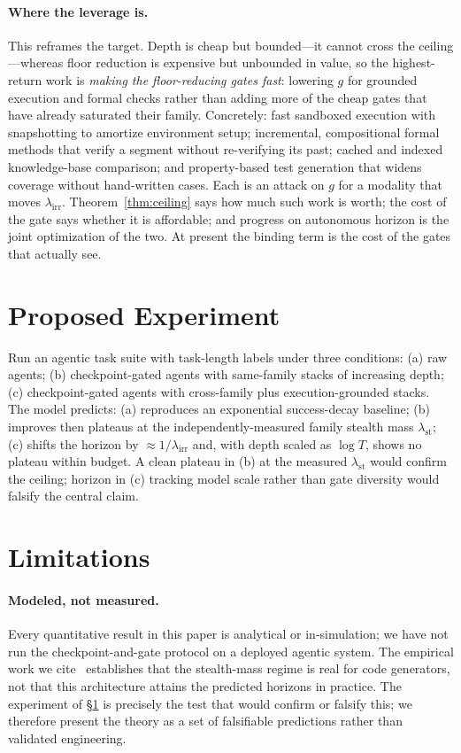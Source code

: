 \documentclass[11pt]{article}
\theoremstyle{remark}
\newcommand{\lst}{\lambda_{\mathrm{st}}}
\newcommand{\lirr}{\lambda_{\mathrm{irr}}}
\begin{document}
\paragraph{Where the leverage is.} This reframes the target. Depth is cheap but bounded---it cannot
cross the ceiling---whereas floor reduction is expensive but unbounded in value, so the
highest-return work is \emph{making the floor-reducing gates fast}: lowering $g$ for grounded
execution and formal checks rather than adding more of the cheap gates that have already saturated
their family.
Concretely: fast sandboxed execution with snapshotting to amortize environment setup;
incremental, compositional formal methods that verify a segment without re-verifying its past;
cached and indexed knowledge-base comparison; and property-based test generation that widens
coverage without hand-written cases.
Each is an attack on $g$ for a modality that moves $\lirr$.
Theorem~\ref{thm:ceiling} says how much such work is worth; the cost of the gate says whether it is
affordable; and progress on autonomous horizon is the joint optimization of the two. At present the
binding term is the cost of the gates that actually see.

\section{Proposed Experiment}\label{sec:experiment}
Run an agentic task suite with task-length labels under three conditions: (a) raw agents;
(b) checkpoint-gated agents with same-family stacks of increasing depth; (c) checkpoint-gated
agents with cross-family plus execution-grounded stacks.
The model predicts: (a) reproduces an
exponential success-decay baseline; (b) improves then plateaus at the independently-measured family
stealth mass $\lst$;
(c) shifts the horizon by $\approx 1/\lirr$ and, with depth scaled as
$\log T$, shows no plateau within budget.
A clean plateau in (b) at the measured $\lst$ would
confirm the ceiling;
horizon in (c) tracking model scale rather than gate diversity would falsify
the central claim.

\section{Limitations}\label{sec:limitations}
\paragraph{Modeled, not measured.} Every quantitative result in this paper is analytical or
in-simulation; we have not run the checkpoint-and-gate protocol on a deployed agentic system.
The empirical work we cite~\cite{ron2026} establishes that the stealth-mass regime is real for
code generators, not that this architecture attains the predicted horizons in practice.
The
experiment of \S\ref{sec:experiment} is precisely the test that would confirm or falsify this; we
therefore present the theory as a set of falsifiable predictions rather than validated engineering.
\end{document}
